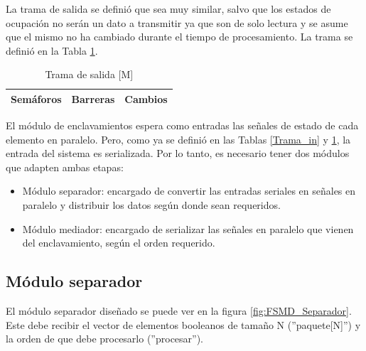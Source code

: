 	La trama de salida se definió que sea muy similar, salvo que los estados de ocupación no serán un dato a transmitir ya que son de solo lectura y se asume que el mismo no ha cambiado durante el tiempo de procesamiento. La trama se definió en la Tabla \ref{Trama_out}.
	
	\begin{table}[!hbt]
	\renewcommand{\arraystretch}{1.3}
	\caption{Trama de salida [M]}
	\label{Trama_out}
	\centering
	\begin{tabular}{| c | c | c | }
	\hline
	  Semáforos & Barreras & Cambios \\
	\hline	
	\end{tabular}
	\end{table}	
	
	El módulo de enclavamientos espera como entradas las señales de estado de cada elemento en paralelo. Pero, como ya se definió en las Tablas \ref{Trama_in} y \ref{Trama_out}, la entrada del sistema es serializada. Por lo tanto, es necesario tener dos módulos que adapten ambas etapas: 
	
	\begin{itemize}
		\item Módulo separador: encargado de convertir las entradas seriales en señales en paralelo y distribuir los datos según donde sean requeridos.
		\item Módulo mediador: encargado de serializar las señales en paralelo que vienen del enclavamiento, según el orden requerido.
	\end{itemize}
	 
	\subsection{Módulo separador}
	
		El módulo separador diseñado se puede ver en la figura \ref{fig:FSMD_Separador}. Este debe recibir el vector de elementos booleanos de tamaño N (''paquete[N]'') y la orden de que debe procesarlo (''procesar''). 
		
